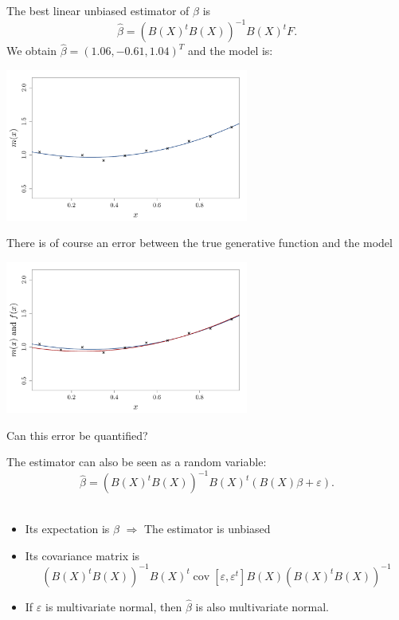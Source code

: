 \documentclass{beamer}
\DeclareMathOperator*{\Cov}{cov}
\begin{document}
\begin{frame}{}
\begin{example}
The best linear unbiased estimator of $\beta$ is
$$\hat{\beta} = (B(X)^t B(X))^{-1} B(X)^t F.$$
We obtain $\hat{\beta} = (1.06,-0.61,1.04)^T$ and the model is:
\begin{center}
  \includegraphics[height=5cm]{figures/R/linreg_2}
\end{center}
\end{example}
\end{frame}

\begin{frame}{}
\begin{example}
There is of course an error between the true generative function and the model
\begin{center}
  \includegraphics[height=5cm]{figures/R/linreg_3}
\end{center}
Can this error be quantified?
\end{example}
\end{frame}

\begin{frame}{}
The estimator can also be seen as a random variable: 
$$\hat{\beta} = (B(X)^t B(X))^{-1} B(X)^t (B(X) \beta  + \varepsilon).$$ \\
\vspace{5mm}
\begin{itemize}
	\item Its expectation is $\beta$ \alert{$\Rightarrow$} The estimator is unbiased
	\item Its covariance matrix is $$(B(X)^t B(X))^{-1} B(X)^t \Cov[\varepsilon,\varepsilon^t] B(X) (B(X)^t B(X))^{-1}$$
	\item If $\varepsilon$ is multivariate normal, then $\hat{\beta}$ is also multivariate normal.
\end{itemize}
\end{frame}
\end{document}
